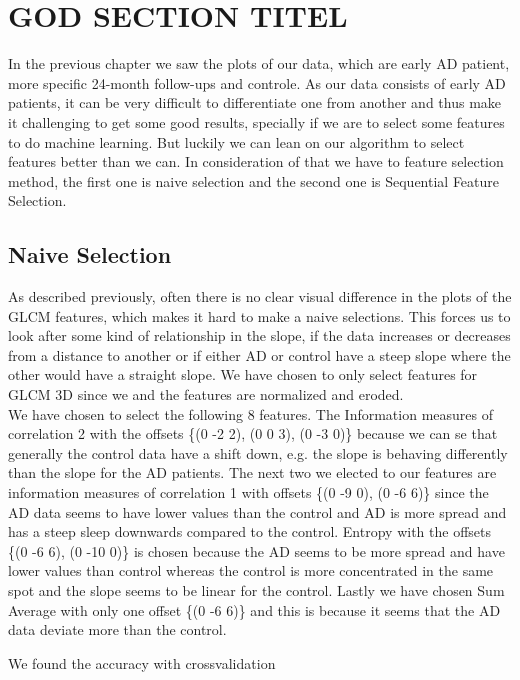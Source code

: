 \section{GOD SECTION TITEL}
In the previous chapter we saw the plots of our data, which are early AD patient, more specific 24-month follow-ups and controle. As our data consists of early AD patients, it can be very difficult to differentiate one from another and thus make it challenging to get some good results, specially if we are to select some features to do machine learning. But luckily we can lean on our algorithm to select features better than we can. In consideration of that we have to feature selection method, the first one is naive selection and the second one is Sequential Feature Selection.

\subsection{Naive Selection}
As described previously, often there is no clear visual difference in the plots of the GLCM features, which makes it hard to make a naive selections. This forces us to look after some kind of relationship in the slope, if the data increases or decreases from a distance to another or if either AD or control have a steep slope where the other would have a straight slope. We have chosen to only select features for GLCM 3D since we  and the features are normalized and eroded.\\
We have chosen to select the following 8 features. The Information measures of correlation 2 with the offsets \{(0 -2 2), (0 0 3), (0 -3 0)\} because we can se that generally the control data have a shift down, e.g. the slope is behaving differently than the slope for the AD patients. The next two we elected to our features are information measures of correlation 1 with offsets \{(0 -9 0), (0 -6 6)\} since the AD data seems to have lower values than the control and AD is more spread and has a steep sleep downwards compared to the control. Entropy with the offsets \{(0 -6 6), (0 -10 0)\} is chosen because the AD seems to be more spread and have lower values than control whereas the control is more concentrated in the same spot and the slope seems to be linear for the control. Lastly we have chosen Sum Average with only one offset \{(0 -6 6)\} and this is because it seems that the AD data deviate more than the control.

We found the accuracy with crossvalidation

